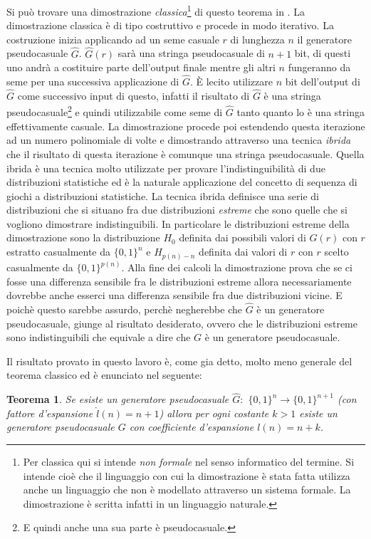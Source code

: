 \documentclass[a4paper,openright,twoside,12pt]{report}
\newtheorem{teorema}{Teorema}[chapter]
\begin{document}
Si pu\`o trovare una dimostrazione \emph{classica}\footnote{Per classica qui si intende \emph{non formale} nel senso informatico del termine.
Si intende cio\`e che il linguaggio con cui la dimostrazione \`e stata fatta utilizza anche un linguaggio che non \`e modellato
attraverso un sistema formale. La dimostrazione \`e scritta infatti in un linguaggio naturale.} di questo teorema in \cite{1206501}. 
La dimostrazione classica \`e di tipo costruttivo e procede in modo iterativo.
La costruzione inizia applicando ad un seme casuale $r$ di lunghezza $n$ il generatore pseudocasuale $\hat{G}$. 
$\hat{G}(r)$ sar\`a una stringa pseudocasuale di $n+1$ bit, di questi uno andr\`a a costituire parte dell'output finale mentre gli altri 
$n$ fungeranno da seme per una successiva applicazione di $\hat{G}$. 
\`E lecito utilizzare $n$ bit dell'output di $\hat{G}$ come successivo input di questo, infatti il risultato di $\hat{G}$ \`e 
una stringa pseudocasuale\footnote{E quindi anche una sua parte \`e pseudocasuale.} e quindi utilizzabile come seme di $\hat{G}$ tanto quanto 
lo \`e una stringa effettivamente casuale.
La dimostrazione procede poi estendendo questa iterazione ad un numero polinomiale di volte e dimostrando attraverso una tecnica \emph{ibrida}
che il risultato di questa iterazione \`e comunque una stringa pseudocasuale. Quella ibrida \`e una tecnica molto utilizzate per provare l'indistinguibilit\`a di due distribuzioni statistiche ed \`e 
la naturale applicazione del concetto di sequenza di giochi a distribuzioni statistiche.
La tecnica ibrida definisce una serie di distribuzioni che si situano fra due distribuzioni \emph{estreme} che sono quelle che si vogliono dimostrare indistinguibili.
In particolare le distribuzioni estreme della dimostrazione sono la distribuzione $H_0$ definita dai possibili valori di $G(r)$ con $r$ estratto casualmente da $\{0,1\}^n$ e 
$H_{p(n)-n}$ definita dai valori di $r$ con $r$ scelto
casualmente da $\{0, 1\}^{p(n)}$. 
Alla fine dei calcoli la dimostrazione prova che se ci fosse una differenza sensibile fra le distribuzioni estreme allora necessariamente dovrebbe anche esserci una differenza
sensibile fra due distribuzioni vicine. E poich\`e questo sarebbe assurdo, perch\`e negherebbe che $\hat{G}$ \`e un generatore pseudocasuale, giunge al risultato desiderato, ovvero che
le distribuzioni estreme sono indistinguibili che equivale a dire che $G$ \`e un generatore pseudocasuale.


Il risultato provato in questo lavoro \`e, come gia detto, molto meno generale del teorema classico ed \`e enunciato nel seguente:
\begin{teorema}
Se esiste un generatore pseudocasuale $\hat{G}:$ $\{0, 1\}^n \rightarrow \{0, 1\}^{n+1}$ 
(con fattore d'espansione $\hat{l}(n)=n+1$) allora per ogni costante $k > 1$ esiste un generatore 
pseudocasuale $G$ con coefficiente d'espansione $l(n)=n+k$.
\end{teorema}
\end{document}
